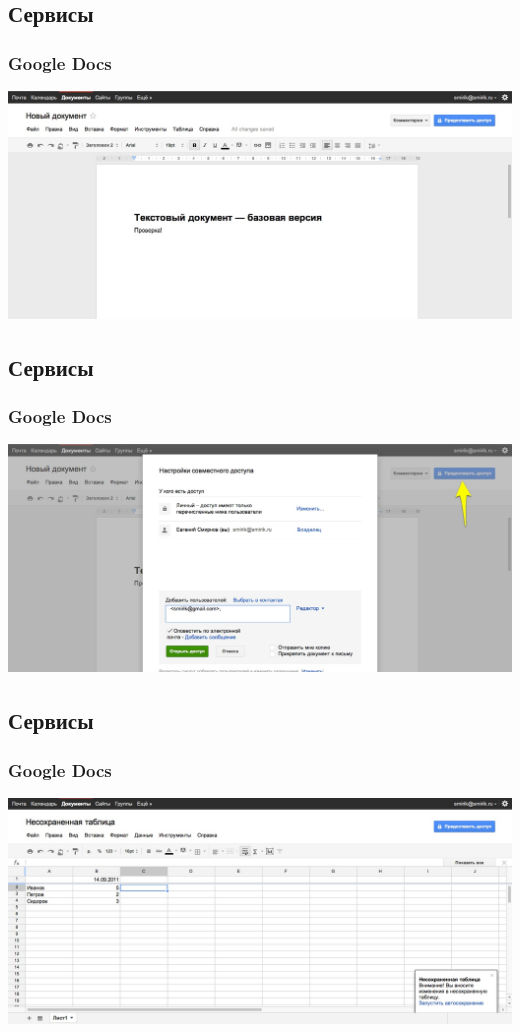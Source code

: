 \documentclass[compress,red]{beamer}
\begin{document}
\subsection{Сервисы}
\begin{frame}
  \frametitle{Google Docs}
	\centerline{\includegraphics[width=1.0\textwidth]{images/gdocs2.jpg}}
\end{frame}

\subsection{Сервисы}
\begin{frame}
  \frametitle{Google Docs}
	\centerline{\includegraphics[width=1.0\textwidth]{images/gdocs3.jpg}}
\end{frame}

\subsection{Сервисы}
\begin{frame}
  \frametitle{Google Docs}
	\centerline{\includegraphics[width=1.0\textwidth]{images/gdocs4.jpg}}
\end{frame}
\end{document}

